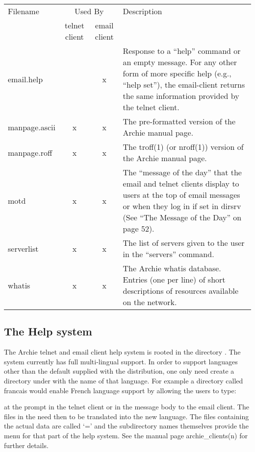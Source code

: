 \begin{tabular}{|l|c|c|p{3.5in}|}\hline

Filename & \multicolumn{2}{c|}{Used By} & Description \\ \cline{2-3}
& telnet client & email client & \\ \hline \hline 

email.help & & x &
Response to a ``help'' command or an empty message. For any other form of more
specific help (e.g., ``help set''), the email-client returns the same
information provided by the telnet client. \\ \hline

manpage.ascii & x & x &
The pre-formatted version of the Archie manual page. \\ \hline

manpage.roff & x & x &
The troff(1) (or nroff(1)) version of the Archie manual page. \\ \hline

motd & x & x &
The ``message of the day'' that the email and telnet clients display to users at
the top of email messages or when they log in if set in dirsrv (See ``The
Message of the Day'' on page 52). \\ \hline

serverlist & x & x &
The list of servers given to the user in the ``servers'' command. \\ \hline

whatis & x & x &
The Archie whatis database. Entries (one per line) of short descriptions of
resources available on the network.
\\ \hline
\end{tabular}


\subsection{The Help system}
The Archie telnet and email client help system is rooted in the directory
. The system currently has full multi-lingual support. In order to
support languages other than the default supplied with the distribution, one
only need create a directory under  with the name of that
language. For example a directory called francais would enable French language
support by allowing the users to type:






at the prompt in the telnet client or in the message body to the email
client. The files in the  need then to be translated into
the new language. The files containing the actual data are called `=' and the
subdirectory names themselves provide the menu for that part of the help
system. See the manual page archie\_clients(n) for further details.


